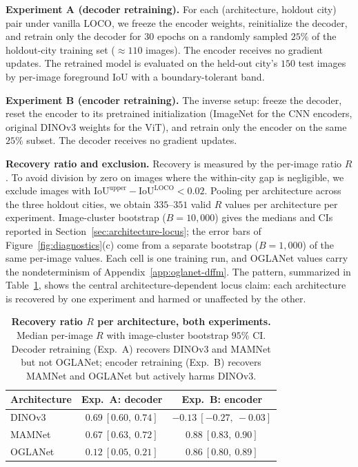 \textbf{Experiment A (decoder retraining).} For each (architecture, holdout city) pair under vanilla LOCO, we freeze the encoder weights, reinitialize the decoder, and retrain only the decoder for $30$ epochs on a randomly sampled $25\%$ of the holdout-city training set ($\approx 110$ images). The encoder receives no gradient updates. The retrained model is evaluated on the held-out city's $150$ test images by per-image foreground IoU with a boundary-tolerant band.

\textbf{Experiment B (encoder retraining).} The inverse setup: freeze the decoder, reset the encoder to its pretrained initialization (ImageNet for the CNN encoders, original DINOv3 weights for the ViT), and retrain only the encoder on the same $25\%$ subset. The decoder receives no gradient updates.

\textbf{Recovery ratio and exclusion.} Recovery is measured by the per-image ratio $R$. To avoid division by zero on images where the within-city gap is negligible, we exclude images with $\text{IoU}^{\text{upper}} - \text{IoU}^{\text{LOCO}} < 0.02$. Pooling per architecture across the three holdout cities, we obtain $335$--$351$ valid $R$ values per architecture per experiment. Image-cluster bootstrap ($B = 10{,}000$) gives the medians and CIs reported in Section~\ref{sec:architecture-locus}; the error bars of Figure~\ref{fig:diagnostics}(c) come from a separate bootstrap ($B = 1{,}000$) of the same per-image values. Each cell is one training run, and OGLANet values carry the nondeterminism of Appendix~\ref{app:oglanet-dffm}. The pattern, summarized in Table~\ref{tab:locus-summary}, shows the central architecture-dependent locus claim: each architecture is recovered by one experiment and harmed or unaffected by the other.

\begin{table}[h]
\centering
\small
\setlength{\tabcolsep}{6pt}
\caption{\textbf{Recovery ratio $R$ per architecture, both experiments.} Median per-image $R$ with image-cluster bootstrap $95\%$ CI. Decoder retraining (Exp.~A) recovers DINOv3 and MAMNet but not OGLANet; encoder retraining (Exp.~B) recovers MAMNet and OGLANet but actively harms DINOv3.}
\label{tab:locus-summary}
\begin{tabular}{lcc}
\toprule
\textbf{Architecture} & \textbf{Exp.~A: decoder} & \textbf{Exp.~B: encoder} \\
\midrule
DINOv3   & $0.69\ [0.60,\ 0.74]$ & $-0.13\ [-0.27,\ -0.03]$ \\
MAMNet   & $0.67\ [0.63,\ 0.72]$ & $0.88\ [0.83,\ 0.90]$    \\
OGLANet  & $0.12\ [0.05,\ 0.21]$ & $0.86\ [0.80,\ 0.89]$    \\
\bottomrule
\end{tabular}
\end{table}


